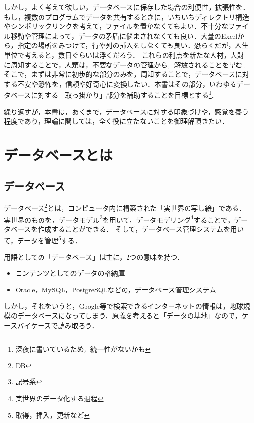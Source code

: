 \documentclass[a4paper,10pt]{jreport}
\begin{document}
\par しかし，よく考えて欲しい，データベースに保存した場合の利便性，拡張性を．もし，複数のプログラムでデータを共有するときに，いちいちディレクトリ構造やシンボリックリンクを考えて，ファイルを置かなくてもよい．不十分なファイル移動や管理によって，データの矛盾に悩まされなくても良い．大量のExcelから，指定の場所をみつけて，行や列の挿入をしなくても良い．恐らくだが，人生単位で考えると，数日ぐらいは浮くだろう．
これらの利点を新たな人材，人財に周知することで，人類は，不要なデータの管理から，解放されることを望む．そこで，まずは非常に初歩的な部分のみを，周知することで，データベースに対する不安や恐怖を，信頼や好奇心に変換したい．本書はその部分，いわゆるデータベースに対する「取っ掛かり」部分を補助することを目標とする\footnote{深夜に書いているため，統一性がないかも}．
\par 繰り返すが，本書は，あくまで，データベースに対する印象づけや，感覚を養う程度であり，理論に関しては，全く役に立たないことを御理解頂きたい．

\chapter{データベースとは}
\section{データベース}
データベース\footnote{DB}とは，コンピュータ内に構築された「実世界の写し絵」である．実世界のものを，データモデル\footnote{記号系}を用いて，データモデリング\footnote{実世界のデータ化する過程}することで，データベースを作成することができる．
そして，データベース管理システムを用いて，データを管理\footnote{取得，挿入，更新など}する．
\par 用語としての「データベース」は主に，2つの意味を持つ．
\begin{itemize}
	\item コンテンツとしてのデータの格納庫
	\item Oracle，MySQL，PostgreSQLなどの，データベース管理システム
\end{itemize}
\par しかし，それをいうと，Google等で検索できるインターネットの情報は，地球規模のデータベースになってしまう．原義を考えると「データの基地」なので，ケースバイケースで読み取ろう．
\end{document}
